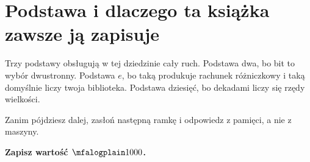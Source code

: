 \section{Podstawa i dlaczego ta książka zawsze ją zapisuje}
\label{sec:F03-base}

\begin{fr}
Trzy podstawy obsługują w tej dziedzinie cały ruch. Podstawa dwa, bo bit to
wybór dwustronny. Podstawa $e$, bo taką produkuje rachunek różniczkowy i taką
domyślnie liczy twoja biblioteka. Podstawa dziesięć, bo dekadami liczy się
rzędy wielkości.

Zanim pójdziesz dalej, zasłoń następną ramkę i odpowiedz z pamięci, a nie z
maszyny.

\textbf{Zapisz wartość $\mfalogplain 1000$.}
\dotline
\nextframe
\end{fr}

